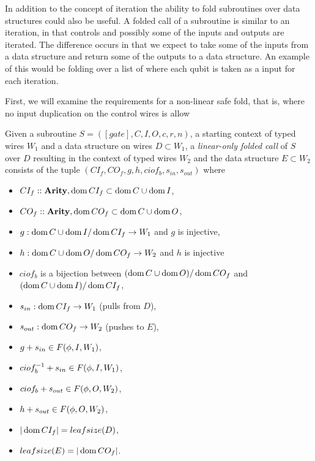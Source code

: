 In addition to the concept of iteration the ability to fold
subroutines over data structures could also be useful. A
folded call of a subroutine is similar to an iteration, in
that controls and possibly some of the inputs
and outputs are iterated. The difference occurs in that we
expect to take some of the inputs from a data structure and
return some of the outputs to a data structure. An example of
this would be folding over a list of  where
each qubit is taken as a input for each iteration.

First, we will examine the requirements for a non-linear
safe fold, that is, where no input duplication on the
control wires is allow



\begin{definition}\label{def:linear_only_subroutine_fold}
  Given a subroutine $S=([gate],C,I,O,c,r,n)$, a starting context of
  typed wires $W_1$ and a data structure on wires $D\subset W_1$, a
  \emph{linear-only folded call} of $S$ over $D$ resulting in the context
  of typed wires $W_2$ and the data structure $E\subset W_2$ consists of the
  tuple $(CI_f,CO_f,  g, h, ciof_b, s_{in}, s_{out})$ where
  \begin{itemize}
    \item $CI_f::\mathbf{{Arity}}, \operatorname*{dom}{CI_f} \subset \operatorname*{dom}{C}\cup \operatorname*{dom}{I}$,
    \item $CO_f::\mathbf{{Arity}}, \operatorname*{dom}{CO_f} \subset \operatorname*{dom}{C}\cup \operatorname*{dom}{O}$,
    \item $g:\operatorname*{dom}{C}\cup\operatorname*{dom} I / \operatorname*{dom}{CI_f} \to W_1$ and $g$ is injective,
    \item $h:\operatorname*{dom}{C}\cup\operatorname*{dom} O /\operatorname*{dom}{CO_f} \to W_2$ and $h$ is injective
    \item $ciof_b$ is a bijection between $(\operatorname*{dom}{C}\cup\operatorname*{dom}{O})/\operatorname*{dom}{CO_f}$
      and $(\operatorname*{dom}{C}\cup\operatorname*{dom}{I})/\operatorname*{dom}{CI_f}$,
    \item $s_{in}: \operatorname*{dom}{CI_f} \to W_1$ (pulls from $D$),
    \item $s_{out}: \operatorname*{dom}{CO_f} \to W_2$ (pushes to $E$),
    \item $g + s_{in} \in F(\phi,I,W_1)$,
    \item $ciof_b^{-1} + s_{in} \in F(\phi,I,W_1)$,
    \item $ciof_b + s_{out} \in F(\phi,O,W_2)$,
    \item $h + s_{out} \in F(\phi,O,W_2)$,
    \item $|\operatorname*{dom}{CI_f}| = leafsize(D)$,
    \item $leafsize(E) = |\operatorname*{dom}{CO_f}|$.
  \end{itemize}
\end{definition}

